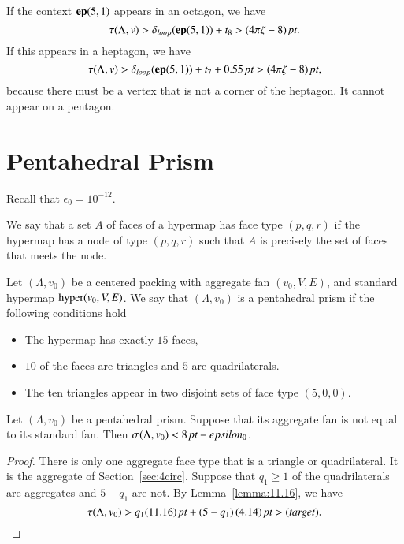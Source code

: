 If the context ${\operatorname{\bf ep}}{(5,1)}$ appears in an octagon, we have
    $$\tau(\Lambda,v) >{\delta}_{loop}({\operatorname{\bf ep}}{(5,1)})+t_8>(4\pi\zeta-8)\,\hbox{\it pt}.$$
If this appears in a heptagon, we have
$$\tau(\Lambda,v) >{\delta}_{loop}({\operatorname{\bf ep}}{(5,1)}) + t_7+ 0.55\,\hbox{\it pt} > (4\pi\zeta-8)\,\hbox{\it pt},$$
because there must be a vertex that is not a corner of the
heptagon. It cannot appear on a pentagon.








\section{Pentahedral Prism}

Recall that $\epsilon_0 = 10^{-12}$.

\begin{definition}[type,~$(p,q,r)$]
We say that a set $A$ of faces of a hypermap has face type $(p,q,r)$ if
the hypermap has a node of type $(p,q,r)$ such that $A$ is precisely the
set of faces that meets the node.
\end{definition}


\begin{definition}
Let $(\Lambda,v_0)$ be a centered packing with aggregate fan $(v_0,V,E)$,
and standard hypermap ${\operatorname{hyper}}(v_0,V,E)$.
We say that $(\Lambda,v_0)$ is a pentahedral prism if the following conditions hold 
  \begin{itemize}
   \item The hypermap has exactly $15$ faces, 
   \item  $10$ of the faces are triangles and $5$ are quadrilaterals.
   \item The ten triangles appear in two disjoint sets of face type $(5,0,0)$.
  \end{itemize}
\end{definition}

\begin{lemma}
Let $(\Lambda,v_0)$ be a pentahedral prism.  Suppose that its aggregate
fan is not equal to its standard fan.  Then 
    $\sigma(\Lambda,v_0) < 8\,\hbox{\it pt} - epsilon_0$.
\end{lemma}

\begin{proof} There is only one aggregate face type that is a triangle or quadrilateral.  It is the aggregate of Section~\ref{sec:4circ}.   Suppose that $q_1\ge 1$ of the quadrilaterals are aggregates and $5-q_1$ are not. 
By Lemma~\ref{lemma:11.16}, we have
   $$
   \tau(\Lambda,v_0) > q_1 (11.16)\,\hbox{\it pt} + (5-q_1)\,(4.14)\,\hbox{\it pt}
    > (\operatorname{\it{target}}).
   $$
\end{proof}


